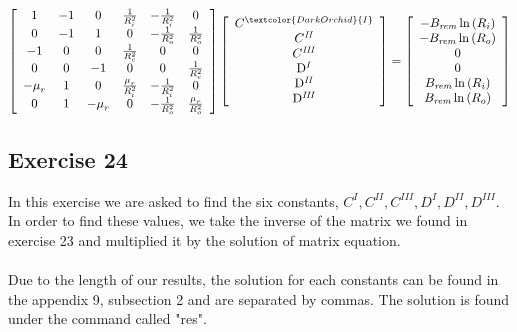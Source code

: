 \documentclass{article}
\begin{document}
\begin{equation}
\left[\begin{array}{cccccc}
1 & -1 & 0 & \frac{1}{R_{i}^{2}} & -\frac{1}{R_{i}^{2}} & 0 
\\
 0 & -1 & 1 & 0 & -\frac{1}{R_{o}^{2}} & \frac{1}{R_{o}^{2}} 
\\
 -1 & 0 & 0 & \frac{1}{R_{c}^{2}} & 0 & 0 
\\
 0 & 0 & -1 & 0 & 0 & \frac{1}{R_{e}^{2}} 
\\
 -\mu_{r}^{} & 1 & 0 & \frac{\mu_{r}^{}}{R_{i}^{2}} & -\frac{1}{R_{i}^{2}} & 0 
\\
 0 & 1 & -\mu_{r}^{} & 0 & -\frac{1}{R_{o}^{2}} & \frac{\mu_{r}^{}}{R_{o}^{2}} 
\end{array}\right]
\left[\begin{array}{c}
C^{\textcolor{DarkOrchid}{I}} 
\\
 C^{\mathit{II}} 
\\
 C^{\mathit{III}} 
\\
 \mathrm{D}^{I} 
\\
 \mathrm{D}^{\mathit{II}} 
\\
 \mathrm{D}^{\mathit{III}}
\end{array}\right]
= \left[\begin{array}{c}
-B_{\mathit{rem}}\ln\left(R_{i}\right) 
\\
 -B_{\mathit{rem}}\ln\left(R_{o}\right) 
\\
 0 
\\
 0
\\
 B_{\mathit{rem}}\ln\left(R_{i}\right) 
\\
 B_{\mathit{rem}}\ln\left(R_{o}\right) 
\end{array}\right]
\end{equation}

\subsection{Exercise 24}
In this exercise we are asked to find the six constants, $C^I, C^{II}, C^{III}, D^{I}, D^{II}, D^{III}$. In order to find these values, we take the inverse of the matrix we found in exercise 23 and multiplied it by the solution of matrix equation. 
\\
\\
Due to the length of our results, the solution for each constants can be found in the appendix 9, subsection 2 and are separated by commas. The solution is found under the command called "res".
\end{document}
